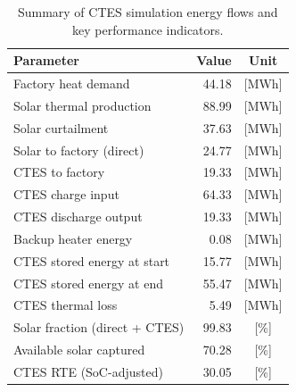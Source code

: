 \renewcommand{\arraystretch}{1.2}
\begin{table}[h]
\centering
\begin{tabular}{l|r c}
\hline
Parameter & Value & Unit \\
\hline
Factory heat demand & 44.18 & [MWh] \\
Solar thermal production & 88.99 & [MWh] \\
Solar curtailment & 37.63 & [MWh] \\
Solar to factory (direct) & 24.77 & [MWh] \\
CTES to factory & 19.33 & [MWh] \\
CTES charge input & 64.33 & [MWh] \\
CTES discharge output & 19.33 & [MWh] \\
Backup heater energy & 0.08 & [MWh] \\
CTES stored energy at start & 15.77 & [MWh] \\
CTES stored energy at end & 55.47 & [MWh] \\
CTES thermal loss & 5.49 & [MWh] \\
\hline
Solar fraction (direct + CTES) & 99.83 & [\%] \\
Available solar captured & 70.28 & [\%] \\
CTES RTE (SoC-adjusted) & 30.05 & [\%] \\
\hline
\end{tabular}
\caption{Summary of CTES simulation energy flows and key performance indicators.}
\label{tab:ctes-simulation-summary}
\end{table}
